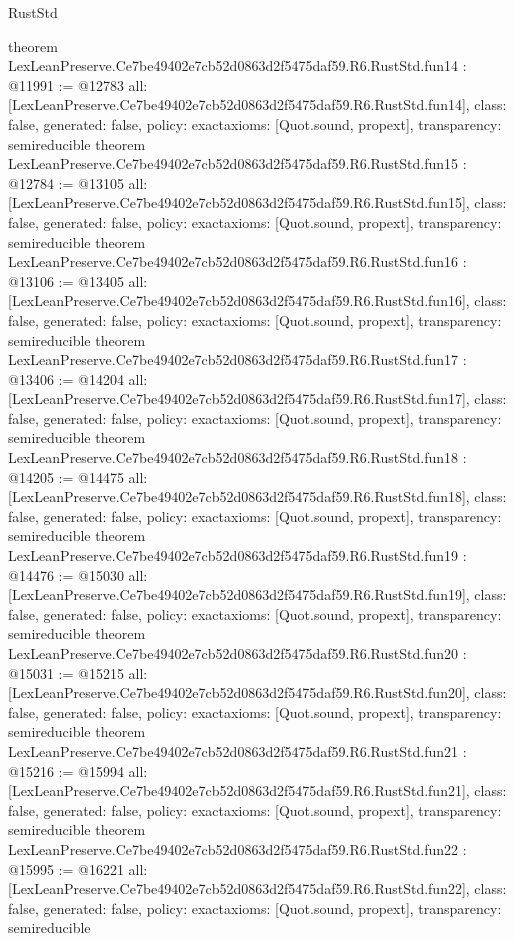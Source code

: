 \begin{lexlean}{RustStd}
\begin{coremodule}
{}
theorem LexLeanPreserve.Ce7be49402e7cb52d0863d2f5475daf59.R6.RustStd.fun14 : @11991 := @12783 {
  all: [LexLeanPreserve.Ce7be49402e7cb52d0863d2f5475daf59.R6.RustStd.fun14],
  class: false,
  generated: false,
  policy: exact{axioms: [Quot.sound, propext]},
  transparency: semireducible
}
theorem LexLeanPreserve.Ce7be49402e7cb52d0863d2f5475daf59.R6.RustStd.fun15 : @12784 := @13105 {
  all: [LexLeanPreserve.Ce7be49402e7cb52d0863d2f5475daf59.R6.RustStd.fun15],
  class: false,
  generated: false,
  policy: exact{axioms: [Quot.sound, propext]},
  transparency: semireducible
}
theorem LexLeanPreserve.Ce7be49402e7cb52d0863d2f5475daf59.R6.RustStd.fun16 : @13106 := @13405 {
  all: [LexLeanPreserve.Ce7be49402e7cb52d0863d2f5475daf59.R6.RustStd.fun16],
  class: false,
  generated: false,
  policy: exact{axioms: [Quot.sound, propext]},
  transparency: semireducible
}
theorem LexLeanPreserve.Ce7be49402e7cb52d0863d2f5475daf59.R6.RustStd.fun17 : @13406 := @14204 {
  all: [LexLeanPreserve.Ce7be49402e7cb52d0863d2f5475daf59.R6.RustStd.fun17],
  class: false,
  generated: false,
  policy: exact{axioms: [Quot.sound, propext]},
  transparency: semireducible
}
theorem LexLeanPreserve.Ce7be49402e7cb52d0863d2f5475daf59.R6.RustStd.fun18 : @14205 := @14475 {
  all: [LexLeanPreserve.Ce7be49402e7cb52d0863d2f5475daf59.R6.RustStd.fun18],
  class: false,
  generated: false,
  policy: exact{axioms: [Quot.sound, propext]},
  transparency: semireducible
}
theorem LexLeanPreserve.Ce7be49402e7cb52d0863d2f5475daf59.R6.RustStd.fun19 : @14476 := @15030 {
  all: [LexLeanPreserve.Ce7be49402e7cb52d0863d2f5475daf59.R6.RustStd.fun19],
  class: false,
  generated: false,
  policy: exact{axioms: [Quot.sound, propext]},
  transparency: semireducible
}
theorem LexLeanPreserve.Ce7be49402e7cb52d0863d2f5475daf59.R6.RustStd.fun20 : @15031 := @15215 {
  all: [LexLeanPreserve.Ce7be49402e7cb52d0863d2f5475daf59.R6.RustStd.fun20],
  class: false,
  generated: false,
  policy: exact{axioms: [Quot.sound, propext]},
  transparency: semireducible
}
theorem LexLeanPreserve.Ce7be49402e7cb52d0863d2f5475daf59.R6.RustStd.fun21 : @15216 := @15994 {
  all: [LexLeanPreserve.Ce7be49402e7cb52d0863d2f5475daf59.R6.RustStd.fun21],
  class: false,
  generated: false,
  policy: exact{axioms: [Quot.sound, propext]},
  transparency: semireducible
}
theorem LexLeanPreserve.Ce7be49402e7cb52d0863d2f5475daf59.R6.RustStd.fun22 : @15995 := @16221 {
  all: [LexLeanPreserve.Ce7be49402e7cb52d0863d2f5475daf59.R6.RustStd.fun22],
  class: false,
  generated: false,
  policy: exact{axioms: [Quot.sound, propext]},
  transparency: semireducible
}
\end{coremodule}
\end{lexlean}
